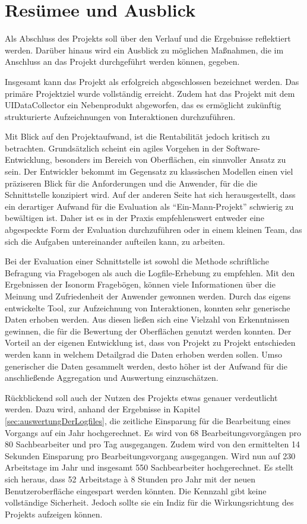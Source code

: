 \section{Resümee und Ausblick}
Als Abschluss des Projekts soll über den Verlauf und die Ergebnisse reflektiert werden. Darüber hinaus wird ein Ausblick zu möglichen Maßnahmen, die im Anschluss an das Projekt durchgeführt werden können, gegeben.

Insgesamt kann das Projekt als erfolgreich abgeschlossen bezeichnet werden. Das primäre Projektziel wurde vollständig erreicht. Zudem hat das Projekt mit dem UIDataCollector ein Nebenprodukt abgeworfen, das es ermöglicht zukünftig strukturierte Aufzeichnungen von Interaktionen durchzuführen.

Mit Blick auf den Projektaufwand, ist die Rentabilität jedoch kritisch zu betrachten. Grundsätzlich scheint ein agiles Vorgehen in der Software-Entwicklung, besonders im Bereich von Oberflächen, ein sinnvoller Ansatz zu sein. Der Entwickler bekommt im Gegensatz zu klassischen Modellen einen viel präziseren Blick für die Anforderungen und die Anwender, für die die Schnittstelle konzipiert wird. Auf der anderen Seite hat sich herausgestellt, dass ein derartiger Aufwand für die Evaluation als \enquote{Ein-Mann-Projekt} schwierig zu bewältigen ist. Daher ist es in der Praxis empfehlenswert entweder eine abgespeckte Form der Evaluation durchzuführen oder in einem kleinen Team, das sich die Aufgaben untereinander aufteilen kann, zu arbeiten. 

Bei der Evaluation einer Schnittstelle ist sowohl die Methode schriftliche Befragung via Fragebogen als auch die Logfile-Erhebung zu empfehlen. Mit den Ergebnissen der Isonorm Fragebögen, können viele Informationen über die Meinung und Zufriedenheit der Anwender gewonnen werden. Durch das eigens entwickelte Tool, zur Aufzeichnung von Interaktionen, konnten sehr generische Daten erhoben werden. Aus diesen ließen sich eine Vielzahl von Erkenntnissen gewinnen, die für die Bewertung der Oberflächen genutzt werden konnten. Der Vorteil an der eigenen Entwicklung ist, dass von Projekt zu Projekt entschieden werden kann in welchem Detailgrad die Daten erhoben werden sollen. Umso generischer die Daten gesammelt werden, desto höher ist der Aufwand für die anschließende Aggregation und Auswertung einzuschätzen.

Rückblickend soll auch der Nutzen des Projekts etwas genauer verdeutlicht werden. Dazu wird, anhand der Ergebnisse in Kapitel \ref{sec:auswertungDerLogfiles}, die zeitliche Einsparung für die Bearbeitung eines Vorgangs auf ein Jahr hochgerechnet. Es wird von 68 Bearbeitungsvorgängen pro 80 Sachbearbeiter und pro Tag ausgegangen. Zudem wird von den ermittelten 14 Sekunden Einsparung pro Bearbeitungsvorgang ausgegangen. Wird nun auf 230 Arbeitstage im Jahr und insgesamt 550 Sachbearbeiter hochgerechnet. Es stellt sich heraus, dass 52 Arbeitstage à 8 Stunden pro Jahr mit der neuen Benutzeroberfläche eingespart werden könnten. Die Kennzahl gibt keine vollständige Sicherheit. Jedoch sollte sie ein Indiz für die Wirkungsrichtung des Projekts aufzeigen können.


